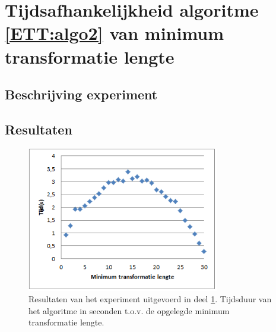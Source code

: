 \section{Tijdsafhankelijkheid algoritme \ref{ETT:algo2} van minimum transformatie lengte}
\label{experiment:9}
\subsection{Beschrijving experiment}

\subsection{Resultaten}
\begin{figure}[!ht]
  \centering
  \includegraphics[width=0.75\textwidth]{5_Experimenten_Resultaten/exp9_res}
  \caption{Resultaten van het experiment uitgevoerd in deel \ref{experiment:9}. Tijdsduur van het algoritme in seconden t.o.v. de opgelegde minimum transformatie lengte.}
  \label{figuur:exp9}
\end{figure}

